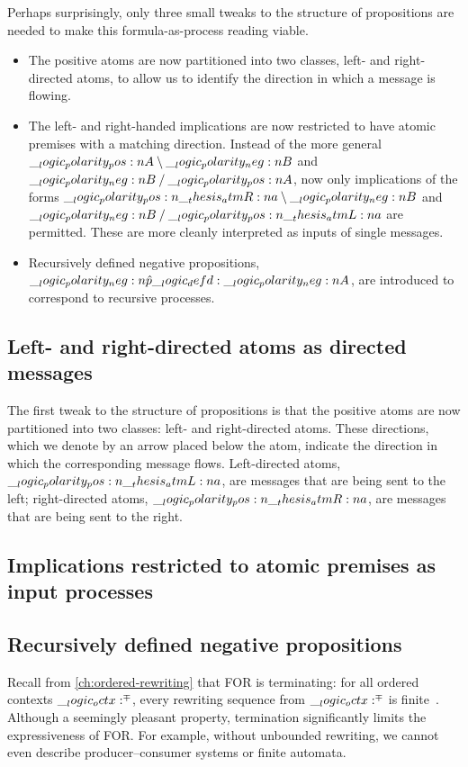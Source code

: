 Perhaps surprisingly, only three small tweaks to the structure of propositions are needed to make this formula-as-process reading viable.
\begin{itemize}
\item
  The positive atoms are now partitioned into two classes, left- and right-directed atoms, to allow us to identify the direction in which a message is flowing.

\item
  The left- and right-handed implications are now restricted to have atomic premises with a matching direction.
  Instead of the more general $\__logic_polarity_pos:n {A} \mathbin { \setminus } \__logic_polarity_neg:n {B}$ and $\__logic_polarity_neg:n {B} \mathbin { / } \__logic_polarity_pos:n {A}$, now only implications of the forms $\__logic_polarity_pos:n {\__thesis_atmR:n {a}} \mathbin { \setminus } \__logic_polarity_neg:n {B}$ and $\__logic_polarity_neg:n {B} \mathbin { / } \__logic_polarity_pos:n {\__thesis_atmL:n {a}}$ are permitted.
  These are more cleanly interpreted as inputs of single messages.

\item 
  Recursively defined negative propositions, $\__logic_polarity_neg:n {\hat{p}} \__logic_defd: \__logic_polarity_neg:n {A}$, are introduced to correspond to recursive processes.
\end{itemize}

\subsection{Left- and right-directed atoms as directed messages}

The first tweak to the structure of propositions is that the positive atoms are now partitioned into two classes: left- and right-directed atoms.
These directions, which we denote by an arrow placed below the atom, indicate the direction in which the corresponding message flows.
Left-directed atoms, $\__logic_polarity_pos:n {\__thesis_atmL:n {a}}$, are messages that are being sent to the left; right-directed atoms, $\__logic_polarity_pos:n {\__thesis_atmR:n {a}}$, are messages that are being sent to the right.

\subsection{Implications restricted to atomic premises as input processes}

\subsection{Recursively defined negative propositions}

Recall from \cref{ch:ordered-rewriting} that \acl{FOR} is terminating: for all ordered contexts $\__logic_octx:^{\mp}$, every rewriting sequence from $\__logic_octx:^{\mp}$ is finite~.
Although a seemingly pleasant property, termination significantly limits the expressiveness of \acl{FOR}.
For example, without unbounded rewriting, we cannot even describe producer--consumer systems or finite automata.

